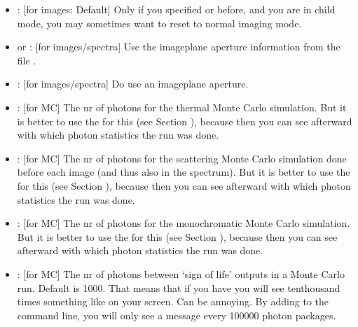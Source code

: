 \documentclass[letterpaper,10pt,english]{sphinxmanual}
\begin{document}
\begin{itemize}
\item {} 
: {[}for images: Default{]} Only if you specified
 or  before, and you are in child mode,
you may sometimes want to reset to normal imaging mode.

\item {} 
 or : {[}for
images/spectra{]} Use the image\sphinxhyphen{}plane aperture information from the file
.

\item {} 
: {[}for images/spectra{]} Do  use an image\sphinxhyphen{}plane aperture.

\item {} 
: {[}for MC{]} The nr of photons for the thermal
Monte Carlo simulation. But it is better to use the  for this
(see Section {\hyperref[\detokenize{inputoutputfiles:sec-radmc-inp}]{}}), because then you can see afterward with
which photon statistics the run was done.

\item {} 
: {[}for MC{]} The nr of photons for the
scattering Monte Carlo simulation done before each image (and thus also in
the spectrum). But it is better to use the  for
this (see Section {\hyperref[\detokenize{inputoutputfiles:sec-radmc-inp}]{}}), because then you can see afterward
with which photon statistics the run was done.

\item {} 
: {[}for MC{]} The nr of photons for
the monochromatic Monte Carlo simulation. But it is better to use the
 for this (see Section {\hyperref[\detokenize{inputoutputfiles:sec-radmc-inp}]{}}),
because then you can see afterward with which photon statistics the run
was done.

\item {} 
: {[}for MC{]} The nr of photons between
‘sign of life’ outputs in a Monte Carlo run. Default is 1000. That means
that if you have  you will see ten\sphinxhyphen{}thousand
times something like  on your screen. Can
be annoying. By adding  to the command
line, you will only see a message every 100000 photon packages.

\end{itemize}
\end{document}
